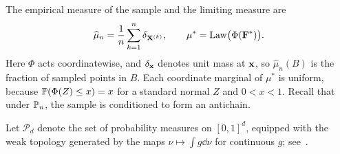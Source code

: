 \documentclass[11pt,letterpaper]{article}
\begin{document}
The empirical measure of the sample and the limiting measure are
\begin{equation}\label{eq:mu_n_hat_definition}
      \widehat\mu_n=\frac1n\sum_{k=1}^n\delta_{\vX^{(k)}}, \qquad \mu^\ast=\law\bigl(\Phi(\vF^\ast)\bigr).
\end{equation}
Here $\Phi$ acts coordinatewise, and $\delta_{\vx}$ denotes unit mass at $\vx$, so $\widehat\mu_n(B)$ is the fraction of sampled points in $B$.
Each coordinate marginal of $\mu^\ast$ is uniform, because $\P(\Phi(Z)\le x)=x$ for a standard normal $Z$ and $0<x<1$. Recall that under $\P_n$, the sample is conditioned to form an antichain.

Let $\mathcal P_d$ denote the set of probability measures on $[0,1]^d$, equipped with the weak topology generated by the maps $\nu\mapsto\int g\dd\nu$ for continuous $g$; see~\cite[Chapter~1]{Billingsley}.
\end{document}
